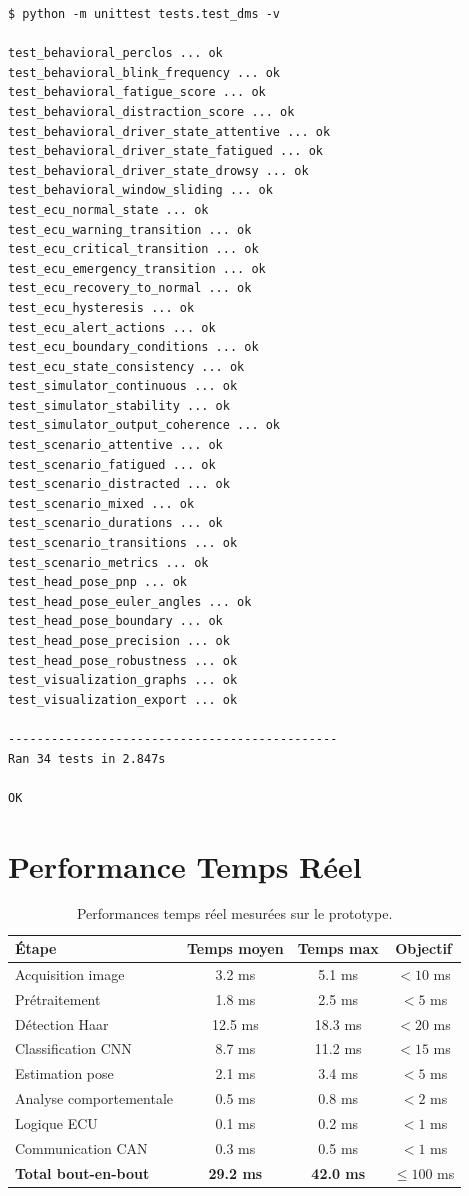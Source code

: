 \begin{lstlisting}[style=pythonstyle, caption={Résultat de l'exécution des tests unitaires.}, label={lst:test_results}, language={}]
$ python -m unittest tests.test_dms -v

test_behavioral_perclos ... ok
test_behavioral_blink_frequency ... ok
test_behavioral_fatigue_score ... ok
test_behavioral_distraction_score ... ok
test_behavioral_driver_state_attentive ... ok
test_behavioral_driver_state_fatigued ... ok
test_behavioral_driver_state_drowsy ... ok
test_behavioral_window_sliding ... ok
test_ecu_normal_state ... ok
test_ecu_warning_transition ... ok
test_ecu_critical_transition ... ok
test_ecu_emergency_transition ... ok
test_ecu_recovery_to_normal ... ok
test_ecu_hysteresis ... ok
test_ecu_alert_actions ... ok
test_ecu_boundary_conditions ... ok
test_ecu_state_consistency ... ok
test_simulator_continuous ... ok
test_simulator_stability ... ok
test_simulator_output_coherence ... ok
test_scenario_attentive ... ok
test_scenario_fatigued ... ok
test_scenario_distracted ... ok
test_scenario_mixed ... ok
test_scenario_durations ... ok
test_scenario_transitions ... ok
test_scenario_metrics ... ok
test_head_pose_pnp ... ok
test_head_pose_euler_angles ... ok
test_head_pose_boundary ... ok
test_head_pose_precision ... ok
test_head_pose_robustness ... ok
test_visualization_graphs ... ok
test_visualization_export ... ok

----------------------------------------------
Ran 34 tests in 2.847s

OK
\end{lstlisting}

\section{Performance Temps Réel}

\begin{table}[H]
\centering
\caption{Performances temps réel mesurées sur le prototype.}
\label{tab:realtime_perf}
\renewcommand{\arraystretch}{1.3}
\begin{tabular}{|l|c|c|c|}
\hline
\rowcolor{stellantisblue!15}
\textbf{Étape} & \textbf{Temps moyen} & \textbf{Temps max} & \textbf{Objectif} \\
\hline
Acquisition image & 3.2 ms & 5.1 ms & $< 10$ ms \\
\hline
Prétraitement & 1.8 ms & 2.5 ms & $< 5$ ms \\
\hline
Détection Haar & 12.5 ms & 18.3 ms & $< 20$ ms \\
\hline
Classification CNN & 8.7 ms & 11.2 ms & $< 15$ ms \\
\hline
Estimation pose & 2.1 ms & 3.4 ms & $< 5$ ms \\
\hline
Analyse comportementale & 0.5 ms & 0.8 ms & $< 2$ ms \\
\hline
Logique ECU & 0.1 ms & 0.2 ms & $< 1$ ms \\
\hline
Communication CAN & 0.3 ms & 0.5 ms & $< 1$ ms \\
\hline
\textbf{Total bout-en-bout} & \textbf{29.2 ms} & \textbf{42.0 ms} & $\leq 100$ ms \\
\hline
\end{tabular}
\end{table}

